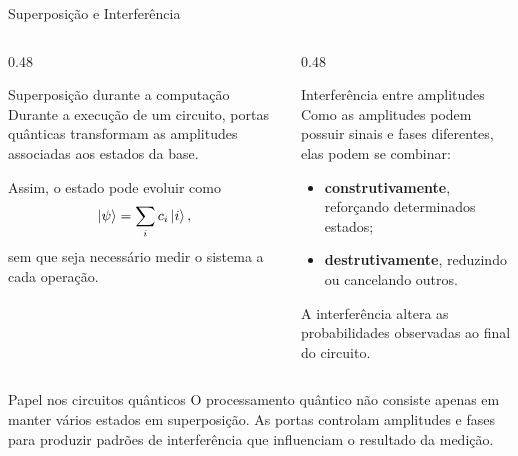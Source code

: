 \begin{frame}{Superposição e Interferência}

\begin{columns}[T,onlytextwidth]

\begin{column}{0.48\textwidth}
  \begin{block}{Superposição durante a computação}
    Durante a execução de um circuito, portas quânticas transformam as
    amplitudes associadas aos estados da base.

    Assim, o estado pode evoluir como
    \[
      \ket{\psi}
      =
      \sum_i c_i\ket{i},
    \]
    sem que seja necessário medir o sistema a cada operação.
  \end{block}
\end{column}

\begin{column}{0.48\textwidth}
  \begin{block}{Interferência entre amplitudes}
    Como as amplitudes podem possuir sinais e fases diferentes, elas podem
    se combinar:
    \begin{itemize}
      \item \textbf{construtivamente}, reforçando determinados estados;
      \item \textbf{destrutivamente}, reduzindo ou cancelando outros.
    \end{itemize}

    A interferência altera as probabilidades observadas ao final do
    circuito.
  \end{block}
\end{column}

\end{columns}

\vspace{0.3cm}

\begin{alertblock}{Papel nos circuitos quânticos}
O processamento quântico não consiste apenas em manter vários estados em
superposição. As portas controlam amplitudes e fases para produzir padrões
de interferência que influenciam o resultado da medição.
\end{alertblock}

\end{frame}


